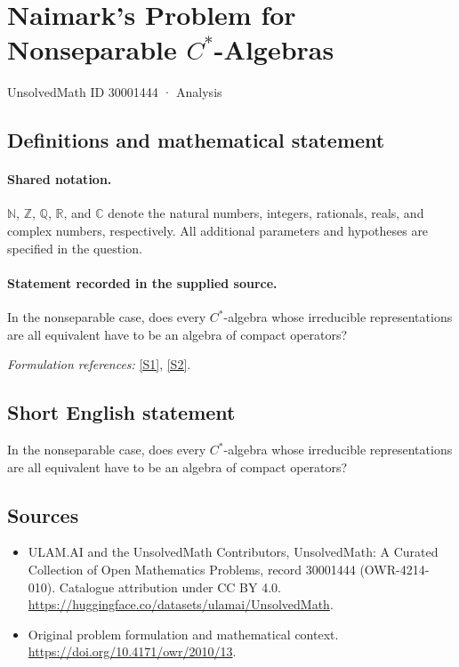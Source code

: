 \documentclass[11pt]{article}
\newcommand{\sref}[2]{\hyperlink{source:#1:#2}{[S#2]}}
\begin{document}
\setcounter{section}{30001443}
\section{\texorpdfstring{Naimark's Problem for Nonseparable $C^*$-Algebras}{Naimark's Problem for Nonseparable C\textasciicircum{}*-Algebras}}\label{30001444}
{\small UnsolvedMath ID 30001444 · Analysis}
\subsection{Definitions and mathematical statement}

\paragraph{Shared notation.}$\mathbb N$, $\mathbb Z$, $\mathbb Q$, $\mathbb R$, and $\mathbb C$ denote the natural numbers, integers, rationals, reals, and complex numbers, respectively. All additional parameters and hypotheses are specified in the question.


\paragraph{Statement recorded in the supplied source.}
In the nonseparable case, does every $C^*$-algebra whose irreducible representations are all equivalent have to be an algebra of compact operators?
\par\smallskip\textit{Formulation references:} \sref{30001444}{1}, \sref{30001444}{2}.
\subsection{Short English statement}
In the nonseparable case, does every $C^*$-algebra whose irreducible representations are all equivalent have to be an algebra of compact operators?
\subsection{Sources}
\begin{itemize}
\item[\hypertarget{source:30001444:1}{S1}] ULAM.AI and the UnsolvedMath Contributors, UnsolvedMath: A Curated Collection of Open Mathematics Problems, record 30001444 (OWR-4214-010). Catalogue attribution under CC BY 4.0.
\url{https://huggingface.co/datasets/ulamai/UnsolvedMath}.
\item[\hypertarget{source:30001444:2}{S2}] Original problem formulation and mathematical context.
\url{https://doi.org/10.4171/owr/2010/13}.
\end{itemize}
\label{end:30001444}
\end{document}
